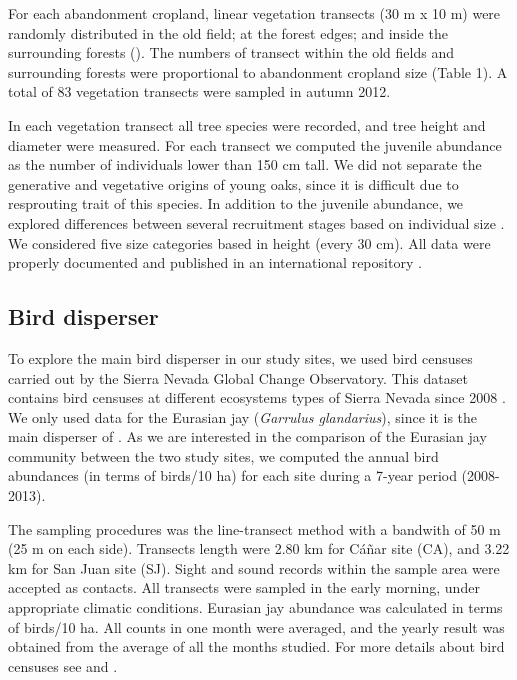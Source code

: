 For each abandonment cropland, linear vegetation transects (30 m x 10 m) were randomly distributed in the old field; at the forest edges; and inside the surrounding forests (). The numbers of transect within the old fields and surrounding forests were proportional to abandonment cropland size (Table 1). A total of 83 vegetation transects were sampled in autumn 2012.

In each vegetation transect all tree species were recorded, and tree height and diameter were measured. For each transect we computed the juvenile abundance as the number of individuals lower than 150 cm tall. We did not separate the generative and vegetative origins of young oaks, since it is difficult due to resprouting trait of this species. In addition to the juvenile abundance, we explored differences between several recruitment stages based on individual size \autocites[\emph{e.g}][]{Plieningeretal2010LargeScalePatterns}. We considered five size categories based in height (every 30 cm). All data were properly documented and published in an international repository \autocites[see][for a detailed description of the dataset]{PerezLuqueetal2015DatasetMIGRAME}. 

\subsection{Bird disperser}\label{sec:coloniza:bird}
To explore the main bird disperser in our study sites, we used bird censuses carried out by the Sierra Nevada Global Change Observatory. This dataset contains bird censuses at different ecosystems types of Sierra Nevada since 2008 \autocites[for more details see][]{BareaAzconetal2012PasseriformesOtrasa, PerezLuqueetal2016DatasetPasserine}. We only used data for the Eurasian jay (\emph{Garrulus glandarius}), since it is the main disperser of \Qpy \autocites{Gomez2003ImpactVertebrate}. As we are interested in the comparison of the Eurasian jay community between the two study sites, we computed the annual bird abundances (in terms of birds/10 ha) for each site during a 7-year period (2008-2013).  

The sampling procedures was the line-transect method with a bandwith of 50 m (25 m on each side). Transects length were 2.80 km for Cáñar site (CA), and 3.22 km for San Juan site (SJ). Sight and sound records within the sample area were accepted as contacts. All transects were sampled in the early morning, under appropriate climatic conditions. Eurasian jay abundance was calculated in terms of birds/10 ha. All counts in one month were averaged, and the yearly result was obtained from the average of all the months studied. For more details about bird censuses see \citet{BareaAzconetal2012PasseriformesOtrasa} and \citet{ZamoraBareaAzcon2015LongTermChanges}.

